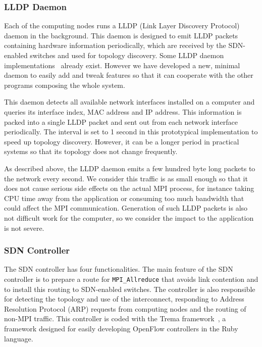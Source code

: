 \hypertarget{lldp-daemon}{%
\subsubsection{LLDP Daemon}\label{lldp-daemon}}

Each of the computing nodes runs a LLDP (Link Layer Discovery
Protocol)~\cite{lldp} daemon in the background. This daemon is designed to
emit LLDP packets containing hardware information periodically, which are
received by the SDN-enabled switches and used for topology discovery. Some
LLDP daemon implementations~\cite{lldpd,openlldpd} already exist. However we
have developed a new, minimal daemon to easily add and tweak features so that
it can cooperate with the other programs composing the whole system.

This daemon detects all available network interfaces installed on a
computer and queries its interface index, MAC address and IP address.
This information is packed into a single LLDP packet and sent out from
each network interface periodically. The interval is set to 1 second in
this prototypical implementation to speed up topology discovery.
However, it can be a longer period in practical systems so that its
topology does not change frequently.

As described above, the LLDP daemon emits a few hundred byte long
packets to the network every second. We consider this traffic is as
small enough so that it does not cause serious side effects on the
actual MPI process, for instance taking CPU time away from the
application or consuming too much bandwidth that could affect the MPI
communication. Generation of such LLDP packets is also not difficult
work for the computer, so we consider the impact to the application is
not severe.

\hypertarget{sdn-controller}{%
\subsubsection{SDN Controller}\label{sdn-controller}}

The SDN controller has four functionalities. The main feature of the SDN
controller is to prepare a route for \texttt{MPI\_Allreduce} that avoids
link contention and to install this routing to SDN-enabled switches. The
controller is also responsible for detecting the topology and use of the
interconnect, responding to Address Resolution Protocol (ARP) requests
from computing nodes and the routing of non-MPI traffic. This controller
is coded with the Trema framework~\cite{trema}, a framework designed for
easily developing OpenFlow controllers in the Ruby~\cite{ruby} language.

